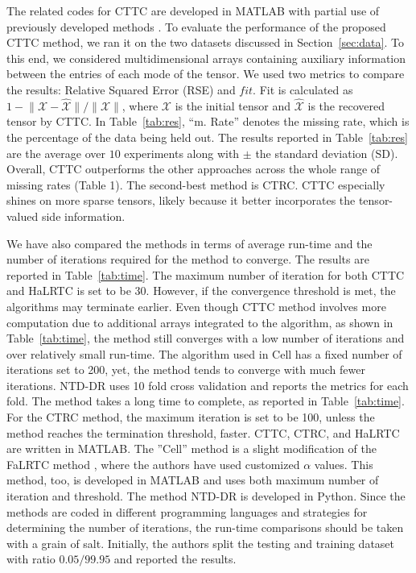 \documentclass{article}
\newcommand{\T}{\mathcal}
\newcommand{\wh}[1]{{\widehat{#1}}}
\begin{document}
The related codes for CTTC are developed in MATLAB with partial use of previously developed methods \cite{bagherian2022bilevel, bagherian2024tensor, bagherian2021coupled, chen2013simultaneous}. To evaluate the performance of the proposed
CTTC method, we ran it on the two datasets discussed in Section~\ref{sec:data}.  To this end, we considered multidimensional arrays containing auxiliary information between the entries of each mode of the tensor. We used two metrics to compare the results:  Relative Squared Error  (RSE) and $fit$. Fit is calculated as $1-{\| \T X- \wh{\T X}\|}/{\|\T X\|}$, where $\T X$ is the initial tensor and $\wh{\T X}$ is the recovered tensor by CTTC.
In Table~\ref{tab:res}, ``m. Rate'' denotes the missing rate, which is the percentage of the data being held out. The results reported in Table~\ref{tab:res} are the average over $10$ experiments along with $\pm$ the standard deviation (SD). Overall, CTTC outperforms the other approaches across the whole range of missing rates (Table 1). The second-best method is CTRC. CTTC especially shines on more sparse tensors, likely because it better incorporates the tensor-valued side information.

We have also compared the methods in terms of average run-time and the number of iterations required for the method to converge. The results are reported in Table~\ref{tab:time}. The maximum number of iteration for both CTTC and HaLRTC is set to be $30$. However, if the convergence threshold is met, the algorithms may terminate earlier. Even though CTTC method involves more computation due to additional arrays integrated to the algorithm, as shown in Table~\ref{tab:time}, the method still converges with a low number of iterations and over relatively small run-time.  The algorithm used in Cell has a fixed number of iterations set to 200, yet, the method tends to converge with much fewer iterations. NTD-DR uses 10 fold cross validation and reports the metrics for each fold. The method takes a long time to complete, as reported in Table~\ref{tab:time}. For the CTRC method, the maximum iteration is set to be 100, unless the method reaches the termination threshold, faster. CTTC, CTRC, and HaLRTC are written in MATLAB. The ''Cell'' method is a slight modification of the FaLRTC method \cite{liu2012tensor}, where the authors have used customized $\alpha$ values. This method, too, is developed in MATLAB and uses both maximum number of iteration and threshold. The method NTD-DR is developed in Python\cite{jamali2022ntd}. Since the methods are coded in different programming languages and strategies for determining the number of iterations, the run-time comparisons should be taken with a grain of salt.  Initially, the authors split the testing and training dataset with ratio $0.05/99.95$ and reported the results. 
 
\end{document}
